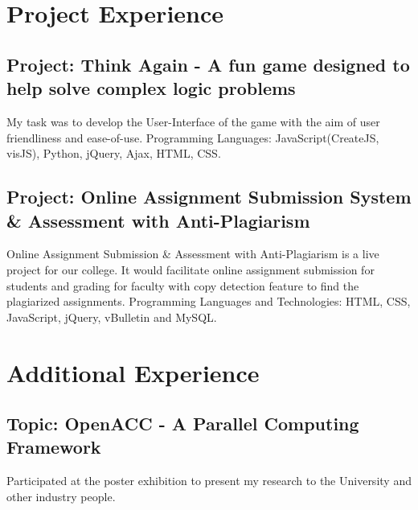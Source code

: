 \documentclass{Mihir_Kavatkar-Resume}
\begin{document}
	\section{Project Experience}
		\vspace*{-0.5em}
		\subsection{Project: Think Again - A fun game designed to help solve complex logic problems}
		\vspace*{-0.5em}
		\workitems
		{My task was to develop the User-Interface of the game with the aim of user friendliness and ease-of-use. }
		{Programming Languages: JavaScript(CreateJS, visJS), Python, jQuery, Ajax, HTML, CSS.}
		
		\vspace*{-0.5em}
		\subsection{Project: Online Assignment Submission System \& Assessment with Anti-Plagiarism}
		\vspace*{-0.5em}
		\workitems
		{Online Assignment Submission \& Assessment with Anti-Plagiarism is a live project for our college. It would facilitate online assignment submission for students and grading for faculty with copy detection feature to find the plagiarized assignments.}
		{Programming Languages and Technologies: HTML, CSS, JavaScript, jQuery, vBulletin and MySQL.}
		
	\section{Additional Experience}
		\vspace*{-0.5em}
		\vspace*{-0.5em}
		\subsection{Topic: OpenACC - A Parallel Computing Framework}
		\workitemsAdditional
		{Participated at the poster exhibition to present my research to the University and other industry people.}
		
\end{document}
